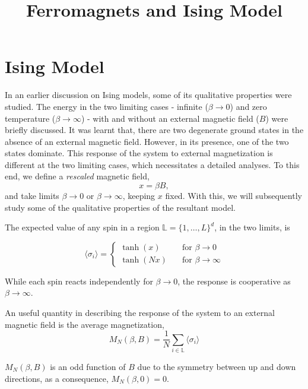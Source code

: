 \documentclass[letterpaper,english,12pt]{article}
\title{Ferromagnets and Ising Model}
\begin{document}
\maketitle
\section{Ising Model}

In an earlier discussion on Ising models, some of its qualitative properties were studied. The energy in the two limiting cases - infinite ($\beta \to 0$) and zero temperature ($\beta \to \infty$) - with and without an external magnetic field ($B$) were briefly discussed. It was learnt that, there are two degenerate ground states in the absence of an external magnetic field. However, in its presence, one of the two states dominate. This response of the system to external magnetization is different at the two limiting cases, which necessitates a detailed analyses. To this end, we define a \textit{rescaled} magnetic field, $$x=\beta B,$$ and take limits $\beta \to 0$ or $\beta \to \infty$, keeping $x$ fixed. With this, we will subsequently study some of the qualitative properties of the resultant model.

\begin{defn}
	The expected value of any spin in a region $\mathbb{L}=\{1,\ldots,L\}^{d}$, in the two limits, is  
	
	\[\langle\sigma_{i}\rangle =
	\begin{cases}
	\tanh(x) & \quad \text{for } \beta \to 0 \\
	\tanh(Nx) & \quad \text{for } \beta \to \infty
	\end{cases}	\]

While each spin reacts independently for $\beta \to 0$, the response is cooperative as $\beta \to \infty$.
\end{defn}
\begin{defn} An useful quantity in describing the response of the system to an external magnetic field is the average magnetization,
	$$M_{N}(\beta,B)=\frac{1}{N}\sum_{i\in \mathbb{L}}\langle\sigma_{i}\rangle$$
	
	$M_{N}(\beta,B)$ is an odd function of $B$ due to the symmetry between up and down directions, as a consequence, $M_{N}(\beta,0) = 0$. 

\end{defn}
\end{document}
